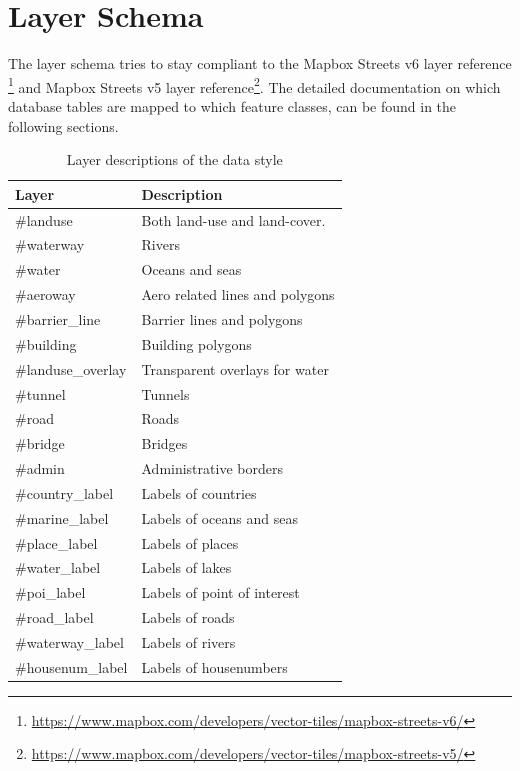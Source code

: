 \newpage
\section{Layer Schema}\label{layer-schema}

The layer schema tries to stay compliant to the Mapbox Streets v6 layer reference \footnote{\url{https://www.mapbox.com/developers/vector-tiles/mapbox-streets-v6/}} and Mapbox Streets v5 layer reference\footnote{\url{https://www.mapbox.com/developers/vector-tiles/mapbox-streets-v5/}}. The detailed documentation on which database tables are mapped to which feature classes, can be found in the following sections.

\begin{table}[H]
    \begin{tabular}{ll}
    \hline
     Layer             & Description                     \\
    \hline
    \#landuse          & Both land-use and land-cover.   \\
    \#waterway         & Rivers                          \\
    \#water            & Oceans and seas                 \\
    \#aeroway          & Aero related lines and polygons \\
    \#barrier\_line    & Barrier lines and polygons      \\
    \#building         & Building polygons               \\
    \#landuse\_overlay & Transparent overlays for water  \\
    \#tunnel           & Tunnels                         \\
    \#road             & Roads                           \\
    \#bridge           & Bridges                         \\
    \#admin            & Administrative borders          \\
    \#country\_label   & Labels of countries             \\
    \#marine\_label    & Labels of oceans and seas       \\
    \#place\_label     & Labels of places                \\
    \#water\_label     & Labels of lakes                 \\
    \#poi\_label       & Labels of point of interest     \\
    \#road\_label      & Labels of roads                 \\
    \#waterway\_label  & Labels of rivers                \\
    \#housenum\_label  & Labels of housenumbers          \\
    \end{tabular}
    \caption{Layer descriptions of the data style}
\end{table}

